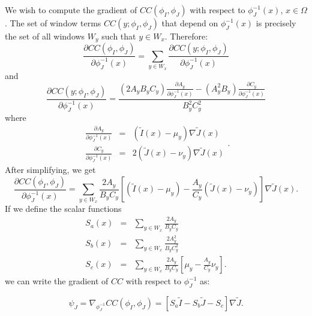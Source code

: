 We wish to compute the gradient of $CC(\phi_{I}, \phi_{J})$ with respect to $\phi^{-1}_{J}(x)$, $x\in\Omega$. The set of window terms $CC(y;\phi_{I}, \phi_{J})$
that depend on $\phi^{-1}_{J}(x)$ is precisely the set of all windows $W_{y}$ such that $y \in W_{x}$. Therefore:
\begin{equation}
    \frac{\partial CC (\phi_{I}, \phi_{J})}{\partial \phi^{-1}_{J}(x)} = \sum_{y \in W_{x}} \frac{\partial CC (y; \phi_{I}, \phi_{J})}{\partial \phi^{-1}_{J}(x)}
\end{equation}
and
\begin{equation}
    \frac{\partial CC (y; \phi_{I}, \phi_{J})}{\partial \phi^{-1}_{J}(x)} =
        \frac{\left(2A_{y} B_{y}C_{y}\right)\frac{\partial A_{y}}{\partial \phi^{-1}_{J}(x)} - \left(A_{y}^{2}B_{y}\right)\frac{\partial C_{y}}{\partial \phi^{-1}_{J}(x)}}
             {B_{y}^{2} C_{y}^{2}}
\end{equation}
where
\begin{equation}
    \begin{array}{lll}
        \frac{\partial A_{y}}{\partial \phi^{-1}_{J}(x)} &=& (\tilde{I}(x) - \mu_{y})\nabla \tilde{J}(x)\\
        \frac{\partial C_{y}}{\partial \phi^{-1}_{J}(x)} &=& 2(\tilde{J}(x) - \nu_{y})\nabla \tilde{J}(x)
    \end{array}.
\end{equation}
After simplifying, we get
\begin{equation}\label{eq:CC_gradient}
    \frac{\partial CC (\phi_{I}, \phi_{J})}{\partial \phi^{-1}_{J}(x)} = \sum_{y \in W_{x}}
         \frac{2A_{y}}
              {B_{y}C_{y}}\left[ (\tilde{I}(x) - \mu_{y}) - \frac{A_{y}}{C_{y}}\left(\tilde{J}(x) - \nu_{y}\right)\right]\nabla \tilde{J}(x).
\end{equation}
If we define the scalar functions
\begin{equation}
    \begin{array}{lll}
        S_{a}(x) &=& \sum_{y \in W_{x}} \frac{2A_{y}}{B_{y}C_{y}}\\
        S_{b}(x) &=& \sum_{y \in W_{x}} \frac{2A_{y}^{2}}{B_{y}C_{y}^{2}}\\
        S_{c}(x) &=& \sum_{y \in W_{x}} \frac{2A_{y}}{B_{y}C_{y}} \left[ \mu_{y} - \frac{A_{y}}{C_{y}}\nu_{y}\right].
    \end{array}
\end{equation}
we can write the gradient of $CC$ with respect to $\phi^{-1}_{J}$ as:

\begin{equation}
    \psi_{J} = \nabla_{\phi^{-1}_{J}} CC(\phi_{I}, \phi_{J}) = \left[S_{a} \tilde{I} - S_{b}\tilde{J} - S_{c}\right]\nabla \tilde{J}.
\end{equation}
